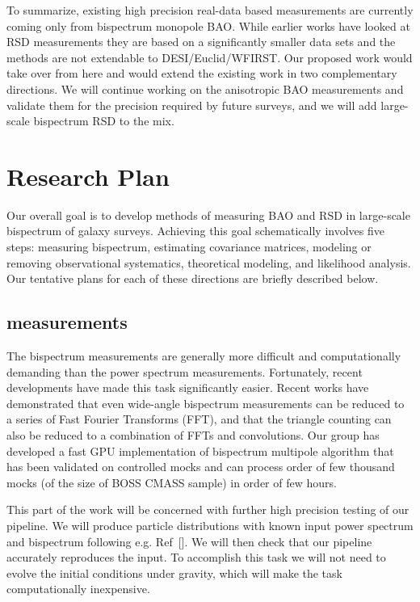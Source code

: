 To summarize, existing high precision real-data based measurements are
currently coming only from bispectrum monopole BAO. While earlier works have
looked at RSD measurements they are based on a significantly smaller data sets
and the methods are not extendable to DESI/Euclid/WFIRST. Our proposed work
would take over from here and would extend the existing work in two
complementary directions. We will continue working on the anisotropic BAO
measurements and validate them for the precision required by future surveys,
and we will add large-scale bispectrum RSD to the mix.

\section{Research Plan}

Our overall goal is to develop methods of measuring BAO and RSD in large-scale
bispectrum of galaxy surveys. Achieving this goal schematically involves five
steps: measuring bispectrum, estimating covariance matrices, modeling or
removing observational systematics, theoretical modeling, and likelihood
analysis. Our tentative plans for each of these directions are briefly
described below.

\subsection*{measurements}

The bispectrum measurements are generally more difficult and computationally
demanding than the power spectrum measurements. Fortunately, recent
developments have made this task significantly easier. Recent works have
demonstrated that even wide-angle bispectrum measurements can be reduced to a
series of Fast Fourier Transforms (FFT), and that the triangle counting can
also be reduced  to a combination of FFTs and convolutions. Our group has
developed a fast GPU implementation of bispectrum multipole algorithm that has
been validated on controlled mocks and can process order of few thousand mocks
(of the size of BOSS CMASS sample) in order of few hours.

This part of the work will be concerned with further high precision testing of
our pipeline. We will produce particle distributions with known input power
spectrum and bispectrum following e.g. Ref~[]. We will then check that our
pipeline accurately reproduces the input. To accomplish this task we will not
need to evolve the initial conditions under gravity, which will make the task
computationally inexpensive. 

